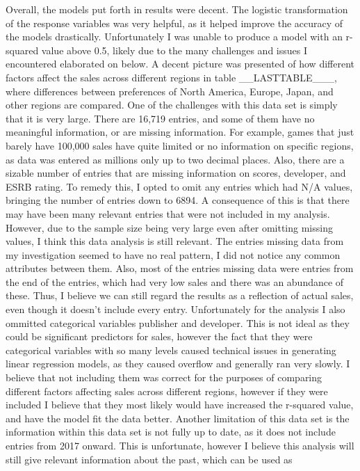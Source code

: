 \documentclass[12pt]{article}
\begin{document}
Overall, the models put forth in results were decent. The logistic transformation of the response variables was very helpful, as it helped improve the accuracy of the models drastically. 
Unfortunately I was unable to produce a model with an r-squared value above 0.5, likely due to the many challenges and issues I encountered elaborated on below.
A decent picture was presented of how different factors affect the sales across different regions in table __LASTTABLE___, where differences between preferences of North America, Europe, Japan, and other regions are compared.
One of the challenges with this data set is simply that it is very large. There are 16,719 entries, and some of them have no meaningful 
information, or are missing information. For example, games that just barely have 100,000 sales have quite limited or no information on 
specific regions, as data was entered as millions only up to two decimal places. Also, there are a sizable number of entries that are 
missing information on scores, developer, and ESRB rating. 
To remedy this, I opted to omit any entries which had N/A values, bringing the number of entries down to 6894. 
A consequence of this is that there may have been many relevant entries that were not included in my analysis.
However, due to the sample size being very large even after omitting missing values, I think this data analysis is still relevant.
The entries missing data from my investigation seemed to have no real pattern, I did not notice any common attributes between them.
Also, most of the entries missing data were entries from the end of the entries, which had very low sales and there was an abundance of these.
Thus, I believe we can still regard the results as a reflection of actual sales, even though it doesn't include every entry.
Unfortunately for the analysis I also ommitted categorical variables publisher and developer. This is not ideal as they could be significant predictors for sales, 
however the fact that they were categorical variables with so many levels caused technical issues in generating linear regression models, 
as they caused overflow and generally ran very slowly. I believe that not including them was correct for the purposes of comparing different factors affecting sales across different regions,
however if they were included I believe that they most likely would have increased the r-squared value, and have the model fit the data better.
Another limitation of this data set is the information within this data set is not fully up to date, as it does not include entries from 2017 
onward. This is unfortunate, however I believe this analysis will still give relevant information about the past, which can be used as 
\end{document}
